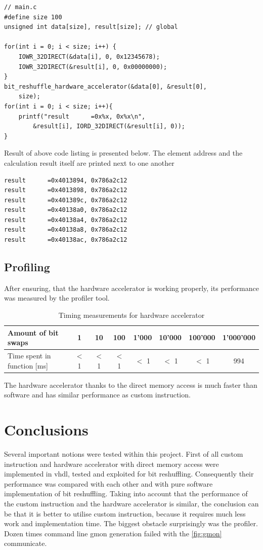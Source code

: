 \begin{lstlisting}[style=customc, frame=none]
// main.c
#define size 100 
unsigned int data[size], result[size]; // global

for(int i = 0; i < size; i++) {
    IOWR_32DIRECT(&data[i], 0, 0x12345678);
    IOWR_32DIRECT(&result[i], 0, 0x00000000);
}
bit_reshuffle_hardware_accelerator(&data[0], &result[0], 
    size);
for(int i = 0; i < size; i++){
    printf("result      =0x%x, 0x%x\n", 
        &result[i], IORD_32DIRECT(&result[i], 0));
}
\end{lstlisting}
Result of above code listing is presented below. The element address and the calculation result itself are printed next to one another
\begin{lstlisting}[frame=none]
result      =0x4013894, 0x786a2c12
result      =0x4013898, 0x786a2c12
result      =0x401389c, 0x786a2c12
result      =0x40138a0, 0x786a2c12
result      =0x40138a4, 0x786a2c12
result      =0x40138a8, 0x786a2c12
result      =0x40138ac, 0x786a2c12
\end{lstlisting}

\section{Profiling}
After ensuring, that the hardware accelerator is working properly, its performance was measured by the profiler tool.
\begin{table}[h!]
\centering
\begin{tabular}{    |l|c|c|c|c|c|c|c|  }
\hline
 Amount of bit swaps & 1 & 10 & 100 & 1'000 & 10'000 & 100'000 & 1'000'000\\
 \hline
 Time spent in function [ms]  & $<$ 1  & $<$ 1  & $<$ 1 & $<$ 1 & $<$ 1 & $<$ 1 & 994\\
 \hline
\end{tabular}
 \caption{Timing measurements for hardware accelerator}
\label{table:softwareCodeMeasure}
\end{table}
The hardware accelerator thanks to the direct memory access is much faster than software and has similar performance as custom instruction. 
\begingroup
\renewcommand{\cleardoublepage}{}
\renewcommand{\clearpage}{}
\chapter{Conclusions}
\endgroup
Several important notions were tested within this project. First of all custom instruction and hardware accelerator with direct memory access were implemented in vhdl, tested and exploited for bit reshuffling. Consequently their performance was compared with each other and with pure software implementation of bit reshuffling. Taking into account that the performance of the custom instruction and the hardware accelerator is similar, the conclusion can be that it is better to utilise custom instruction, because it requires much less work and implementation time. The biggest obstacle surprisingly was the profiler. Dozen times command line gmon generation failed with the \figurename{} \ref{fig:gmon} communicate. 

